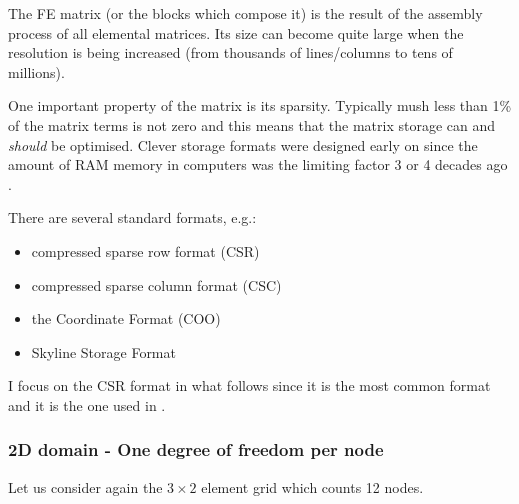 The FE matrix (or the blocks which compose it) 
is the result of the assembly process of all elemental matrices. 
Its size can become quite large when the resolution is being increased (from thousands
of lines/columns to tens of millions).

One important property of the matrix is its sparsity. Typically mush less than 1\% of the 
matrix terms is not zero and this means that the matrix storage can and {\it should} be optimised. 
Clever storage formats were designed early on since the amount of RAM memory in computers
was the limiting factor 3 or 4 decades ago \cite{saad}.

There are several standard formats, e.g.:
\begin{itemize}
\item compressed sparse row format (CSR)  
\item compressed sparse column format (CSC)  
\item the Coordinate Format (COO)
\item Skyline Storage Format
\end{itemize}

I focus on  the CSR format in what follows since it is the most common format 
and it is the one used in \elefant. 

\subsubsection{2D domain - One degree of freedom per node}

Let us consider again the  $3\times2$ element grid which counts 12 nodes.

\begin{center}

\end{center}

